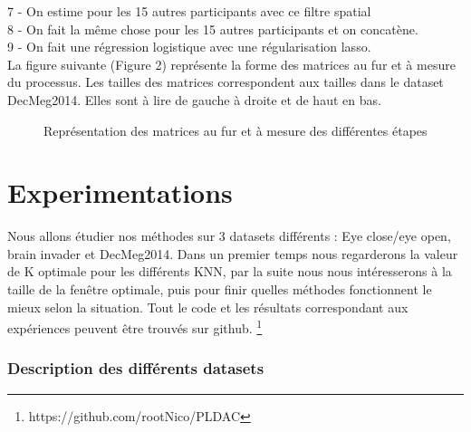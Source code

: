 \documentclass{article}[12pt]
\begin{document}
7 - On estime pour les 15 autres participants avec ce filtre spatial\\
8 - On fait la même chose pour les 15 autres participants et on concatène.\\
9 - On fait une régression logistique avec une régularisation lasso.\\
La figure suivante (Figure 2) représente la forme des matrices au fur et à mesure du processus. Les tailles des matrices correspondent aux tailles dans le dataset DecMeg2014. Elles sont à lire de gauche à droite et de haut en bas.
\\
\begin{figure}[H]
\label{fig2}
\caption{Représentation des matrices au fur et à mesure des différentes étapes}
\end{figure}

\part{Experimentations}
Nous allons étudier nos méthodes sur 3 datasets différents : Eye close/eye open, brain invader et DecMeg2014. Dans un premier temps nous regarderons la valeur de K optimale pour les différents KNN, par la suite nous nous intéresserons à la taille de la fenêtre optimale, puis pour finir quelles méthodes fonctionnent le mieux selon la situation. Tout le code et les résultats correspondant aux expériences peuvent être trouvés sur github. \footnote{https://github.com/rootNico/PLDAC}
\section{Description des différents datasets}
\end{document}
